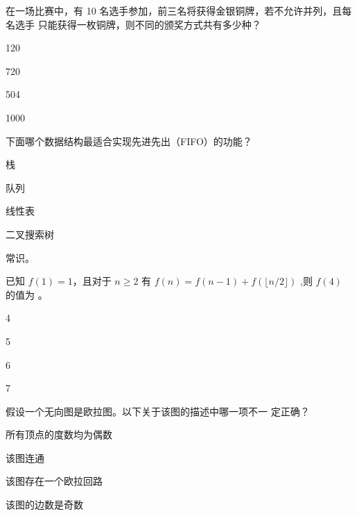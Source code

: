 \documentclass{exam-zh}
\begin{document}
\begin{solution}

\end{solution}


\begin{question}
    在一场比赛中，有 10 名选手参加，前三名将获得金银铜牌，若不允许并列，且每名选手
    只能获得一枚铜牌，则不同的颁奖方式共有多少种？\paren[B]
\begin{choices}
    \item 120
    \item 720
    \item 504
    \item 1000
\end{choices}
\end{question}

\begin{solution}

\end{solution}

\begin{question}
    下面哪个数据结构最适合实现先进先出（FIFO）的功能？\paren[B]
    \begin{choices}
        \item 栈
        \item 队列
        \item 线性表
        \item 二叉搜索树
    \end{choices}
\end{question}

\begin{solution}
常识。
\end{solution}


\begin{question}
    已知 $f(1) = 1$，且对于 $n \ge 2$ 有 $f(n) = f(n - 1) + f( \lfloor n/2 \rfloor )$ ,则 $f(4)$ 的值为 \paren[B] 。
\begin{choices}
    \item 4
    \item 5
    \item 6
    \item 7
\end{choices}
\end{question}

\begin{solution}

\end{solution}

\begin{question}
    假设一个无向图是欧拉图。以下关于该图的描述中哪一项不一
    定正确？\paren[B 或者 D]
    \begin{choices}
        \item 所有顶点的度数均为偶数
        \item 该图连通
        \item 该图存在一个欧拉回路
        \item 该图的边数是奇数
    \end{choices}

\end{question}
\end{document}
